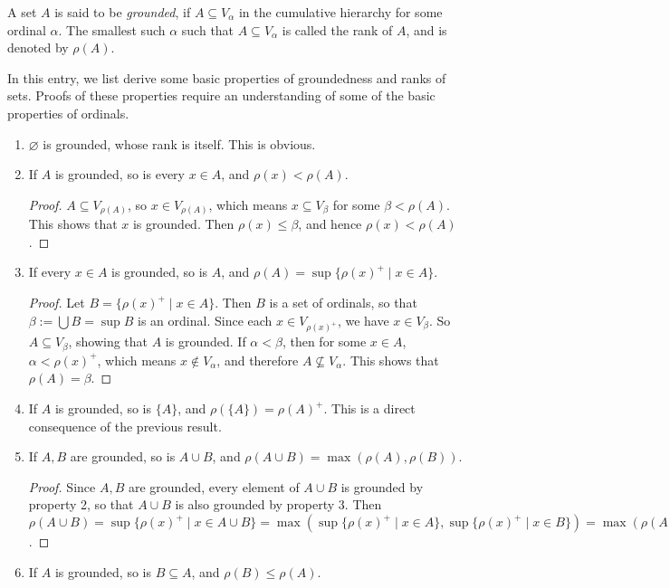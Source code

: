 \documentclass[12pt]{article}
\begin{document}
A set $A$ is said to be \emph{grounded}, if $A\subseteq V_{\alpha}$ in the cumulative hierarchy for some ordinal $\alpha$.  The smallest such $\alpha$ such that $A\subseteq V_{\alpha}$ is called the rank of $A$, and is denoted by $\rho(A)$.

In this entry, we list derive some basic properties of groundedness and ranks of sets.  Proofs of these properties require an understanding of some of the basic properties of ordinals.

\begin{enumerate}
\item $\varnothing$ is grounded, whose rank is itself.  This is obvious.
\item If $A$ is grounded, so is every $x\in A$, and $\rho(x)< \rho(A)$.
\begin{proof}  $A\subseteq V_{\rho(A)}$, so $x\in V_{\rho(A)}$, which means $x\subseteq V_{\beta}$ for some $\beta < \rho(A)$.  This shows that $x$ is grounded.  Then $\rho(x)\le \beta$, and hence $\rho(x)< \rho(A)$.
\end{proof}
\item If every $x\in A$ is grounded, so is $A$, and $\rho(A)=\sup \lbrace \rho(x)^+ \mid x\in A\rbrace$.
\begin{proof}  Let $B=\lbrace \rho(x)^+ \mid x\in A\rbrace$.  Then $B$ is a set of ordinals, so that $\beta:=\bigcup B = \sup B$ is an ordinal.  Since each $x\in V_{\rho(x)^+}$, we have $x\in V_{\beta}$.  So $A\subseteq V_{\beta}$, showing that $A$ is grounded.  If $\alpha <\beta$, then for some $x\in A$, $\alpha < \rho(x)^+$, which means $x\notin V_{\alpha}$, and therefore $A\nsubseteq V_{\alpha}$.  This shows that $\rho(A)=\beta$.
\end{proof}
\item If $A$ is grounded, so is $\lbrace A\rbrace$, and $\rho(\lbrace A\rbrace)=\rho(A)^+$.  This is a direct consequence of the previous result.
\item If $A,B$ are grounded, so is $A\cup B$, and $\rho(A\cup B)=\max(\rho(A),\rho(B))$.
\begin{proof}  Since $A,B$ are grounded, every element of $A\cup B$ is grounded by property 2, so that $A\cup B$ is also grounded by property 3.  Then $\rho(A\cup B) = \sup \lbrace \rho(x)^+ \mid x\in A\cup B\rbrace = \max(\sup \lbrace \rho(x)^+ \mid x\in A \rbrace, \sup \lbrace \rho(x)^+ \mid x\in B\rbrace) = \max(\rho(A),\rho(B))$.
\end{proof}
\item If $A$ is grounded, so is $B\subseteq A$, and $\rho(B)\le \rho(A)$.

\end{enumerate}
\end{document}
